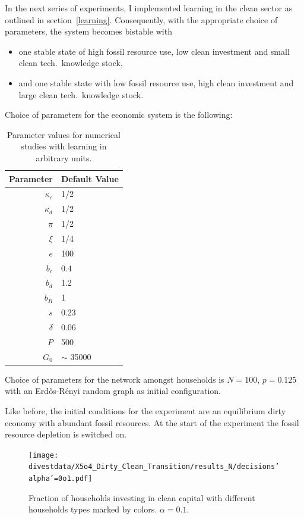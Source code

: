 In the next series of experiments, I implemented learning in the clean sector as outlined in section~\ref{learning}.
Consequently, with the appropriate choice of parameters, the system becomes bistable with 
\begin{itemize}
	\item one stable state of high fossil resource use, low clean investment and small clean tech.\ knowledge stock,
	\item and one stable state with low fossil resource use, high clean investment and large clean tech.\ knowledge stock.
\end{itemize}
Choice of parameters for the economic system is the following:

\begin{table}[H] 
	\centering
	\begin{tabular}{r|l}
		Parameter & Default Value \\\hline
		$\kappa_c$ & 1/2 \\
		$\kappa_d$ & 1/2 \\
		$\pi$ & 1/2 \\
		$\xi$ & 1/4 \\
		$e$ & 100 \\
		$b_c$ & 0.4 \\
		$b_d$ & 1.2 \\
		$b_R$ & 1 \\
		$s$ & 0.23 \\
		$\delta $ & 0.06 \\
		$P$ & 500 \\
		$G_0$ & $\sim$ 35000 \\
	\end{tabular}
	\caption{Parameter values for numerical studies with learning in arbitrary units.}
	\label{tab:learning_parameter_values}
\end{table}

Choice of parameters for the network amongst households is $N=100$, $p=0.125$ with an Erd\H{o}s-R\'enyi random graph as initial configuration. 

Like before, the initial conditions for the experiment are an equilibrium dirty economy with abundant fossil resources. At the start of the experiment the fossil resource depletion is switched on.\

\begin{figure}[H]
	\centering
	\texttt{[image: divestdata/X5o4\_Dirty\_Clean\_Transition/results\_N/decisions'alpha'=0o1.pdf]}
	\caption{Fraction of households investing in clean capital with different households types marked by colors. $\alpha=0.1$.}
	\label{fig:learning_decisions0o1}
\end{figure}

